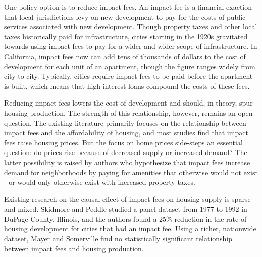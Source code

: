 \documentclass[a4paper,12pt]{article}
\begin{document}
One policy option is to reduce impact fees. An impact fee is a financial exaction that local jurisdictions levy on new development to pay for the costs of public services associated with new development.\cite{been2005impact} Though property taxes and other local taxes historically paid for infrastructure, cities starting in the 1920s gravitated towards using impact fees to pay for a wider and wider scope of infrastructure.\cite{been2005impact} In California, impact fees now can add tens of thousands of dollars to the cost of development for each unit of an apartment, though the figure ranges widely from city to city.\cite{mawhorter2018all} Typically, cities require impact fees to be paid before the apartment is built, which means that high-interest loans compound the costs of these fees.\cite{raetz2019residential}\cite{phillips2021reducing}

Reducing impact fees lowers the cost of development and should, in theory, spur housing production. The strength of this relationship, however, remains an open question. The existing literature primarily focuses on the relationship between impact fees and the affordability of housing, and most studies find that impact fees raise housing prices.\cite{evans2003effects} But the focus on home prices side-steps an essential question: do prices rise because of decreased supply or increased demand?\cite{mayer2000land} The latter possibility is raised by authors who hypothesize that impact fees increase demand for neighborhoods by paying for amenities that otherwise would not exist - or would only otherwise exist with increased property taxes.\cite{been2005impact} 

Existing research on the causal effect of impact fees on housing supply is sparse and mixed. Skidmore and Peddle studied a panel dataset from 1977 to 1992 in DuPage County, Illinois, and the authors found a 25\% reduction in the rate of housing development for cities that had an impact fee.\cite{skidmore1998development} Using a richer, nationwide dataset, Mayer and Somerville find no statistically significant relationship between impact fees and housing production.\cite{mayer2000land}
\end{document}
